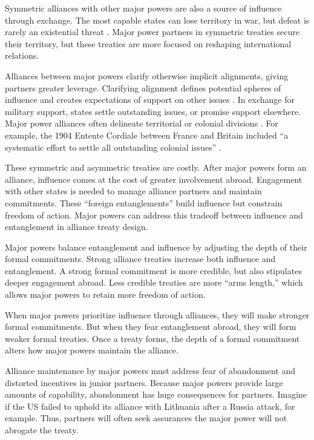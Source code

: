 \documentclass[12pt]{article}
\begin{document}
Symmetric alliances with other major powers are also a source of influence through exchange.
The most capable states can lose territory in war, but defeat is rarely an existential threat \citep{Fazal2011}.  
Major power partners in symmetric treaties secure their territory, but these treaties are more focused on reshaping international relations. 


Alliances between major powers clarify otherwise implicit alignments, giving partners greater leverage. 
Clarifying alignment defines potential spheres of influence and creates expectations of support on other issues \citep{Snyder1997}. 
In exchange for military support, states settle outstanding issues, or promise support elsewhere. 
Major power alliances often delineate territorial or colonial divisions \cite{Langer1950, Kissinger1994}.
For example, the 1904 Entente Cordiale between France and Britain included ``a systematic effort to settle all outstanding colonial issues'' \citep[pg. 189]{Kissinger1994}.   


These symmetric and asymmetric treaties are costly. 
After major powers form an alliance, influence comes at the cost of greater involvement abroad.
Engagement with other states is needed to manage alliance partners and maintain commitments.
These ``foreign entanglements'' build influence but constrain freedom of action.
Major powers can address this tradeoff between influence and entanglement in alliance treaty design. 


Major powers balance entanglement and influence by adjusting the depth of their formal commitments. 
Strong alliance treaties increase both influence and entanglement. 
A strong formal commitment is more credible, but also stipulates deeper engagement abroad. 
Less credible treaties are more ``arms length,'' which allows major powers to retain more freedom of action. 


When major powers prioritize influence through alliances, they will make stronger formal commitments.
But when they fear entanglement abroad, they will form weaker formal treaties. 
Once a treaty forms, the depth of a formal commitment alters how major powers maintain the alliance. 


Alliance maintenance by major powers must address fear of abandonment and distorted incentives in junior partners. 
Because major powers provide large amounts of capability, abandonment has huge consequences for partners. 
Imagine if the US failed to uphold its alliance with Lithuania after a Russia attack, for example. 
Thus, partners will often seek assurances the major power will not abrogate the treaty. 
\end{document}
